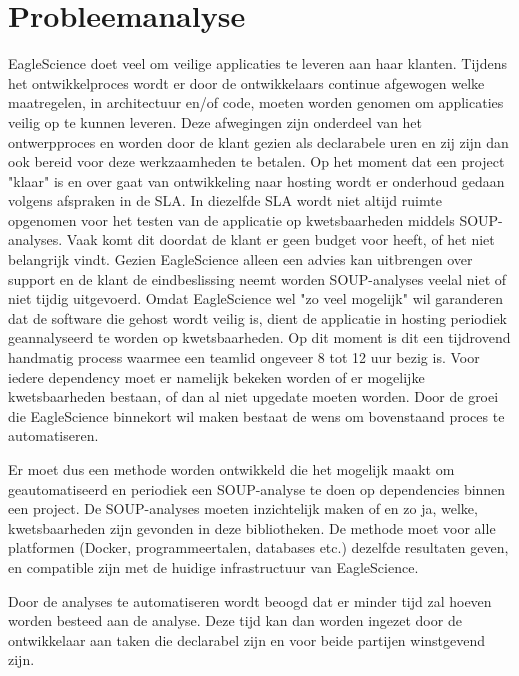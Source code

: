 \section{Probleemanalyse}\label{sec:probleemanalyse}
EagleScience doet veel om veilige applicaties te leveren aan haar klanten. Tijdens het ontwikkelproces wordt er door de ontwikkelaars continue afgewogen welke maatregelen, in architectuur en/of code, moeten worden genomen om applicaties veilig op te kunnen leveren. Deze afwegingen zijn onderdeel van het ontwerpproces en worden door de klant gezien als declarabele uren en zij zijn dan ook bereid voor deze werkzaamheden te betalen. Op het moment dat een project "klaar" is en over gaat van ontwikkeling naar hosting wordt er onderhoud gedaan volgens afspraken in de SLA. In diezelfde SLA wordt niet altijd ruimte opgenomen voor het testen van de applicatie op kwetsbaarheden middels SOUP-analyses. Vaak komt dit doordat de klant er geen budget voor heeft, of het niet belangrijk vindt. Gezien EagleScience alleen een advies kan uitbrengen over support en de klant de eindbeslissing neemt worden SOUP-analyses veelal niet of niet tijdig uitgevoerd. Omdat EagleScience wel "zo veel mogelijk" wil garanderen dat de software die gehost wordt veilig is, dient de applicatie in hosting periodiek geannalyseerd te worden op kwetsbaarheden. Op dit moment is dit een tijdrovend handmatig process waarmee een teamlid ongeveer 8 tot 12 uur bezig is. Voor iedere dependency moet er namelijk bekeken worden of er mogelijke kwetsbaarheden bestaan, of dan al niet upgedate moeten worden. Door de groei die EagleScience binnekort wil maken bestaat de wens om bovenstaand proces te automatiseren.

Er moet dus een methode worden ontwikkeld die het mogelijk maakt om geautomatiseerd en periodiek een SOUP-analyse te doen op dependencies binnen een project. De SOUP-analyses moeten inzichtelijk maken of en zo ja, welke, kwetsbaarheden zijn gevonden in deze bibliotheken. De methode moet voor alle platformen (Docker, programmeertalen, databases etc.) dezelfde resultaten geven, en compatible zijn met de huidige infrastructuur van EagleScience.

Door de analyses te automatiseren wordt beoogd dat er minder tijd zal hoeven worden besteed aan de analyse. Deze tijd kan dan worden ingezet door de ontwikkelaar aan taken die declarabel zijn en voor beide partijen winstgevend zijn.


